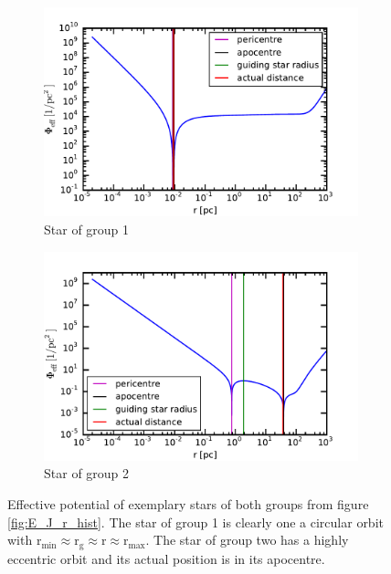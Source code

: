 \begin{figure}
\centering
	\begin{subfigure}{0.475\textwidth}
	\centering
	\includegraphics[width=\textwidth]{Plots/pot_eff_group1.pdf}
	\caption{Star of group 1}
	\label{fig:pot_eff_group1}
	\end{subfigure}
	\hfill
	\begin{subfigure}{0.475\textwidth}
	\centering
	\includegraphics[width=\textwidth]{Plots/pot_eff_group2.pdf}
	\caption{Star of group 2}
	\label{fig:pot_eff_group2}
	\end{subfigure}	
\caption{Effective potential of exemplary stars of both groups from figure \ref{fig:E_J_r_hist}. The star of group 1 is clearly one a circular orbit with \(\mathrm{r_{min}\approx r_g\approx r \approx r_{max} }\). The star of group two has a highly eccentric orbit and its actual position is in its apocentre.}
\label{fig:eff_pot}
\end{figure}

